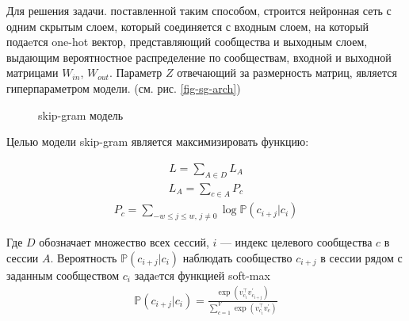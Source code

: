 \documentclass[times,specification,annotation]{itmo-student-thesis}
\begin{document}
Для решения задачи. поставленной таким способом, строится нейронная сеть с одним скрытым слоем, который соединяется с входным слоем, на который подаeтся one-hot вектор, представляющий сообщества и выходным слоем, выдающим вероятностное распределение по сообществам, входной и выходной матрицами $W_{in}$, $W_{out}$. Параметр $Z$ отвечающий за размерность матриц, является гиперпараметром модели. (см. рис. \ref {fig-sg-arch})

\begin{figure}[!h]
\caption{skip-gram модель}\label{fig-sg}
\centering
{}
\end{figure}

Целью модели skip-gram является максимизировать функцию: 

\begin{align}
L = \sum_{A \in D}L_A
\label{eq1}
\end{align}
\begin{align}
L_A = \sum_{c \in A}P_c
\label{eq-a}
\end{align}
\begin{align}
P_c = \sum_{-w \leq j \leq w,\, j \ne 0}\log \mathbb{P}(c_{i + j} | c_i)  
\label{eq-opt-ses}
\end{align}

Где $D$ обозначает множество всех сессий, $i$ --- индекс целевого сообщества $c$ в сессии $A$. Вероятность $\mathbb{P}(c_{i + j} | c_i)$ наблюдать сообщество $c_{i + j}$ в сессии рядом с заданным сообществом $c_i$ задаeтся функцией soft-max 
\begin{align}
\mathbb{P}(c_{i + j} | c_i) = \frac{\exp(v_{c_i}^\top v_{c_{i + j}}^{'})}{\sum_{c = 1}^{V}\exp(v_{c_i}^\top v_{c}^{'})}
\label{eq-softmax}
\end{align}
\end{document}
